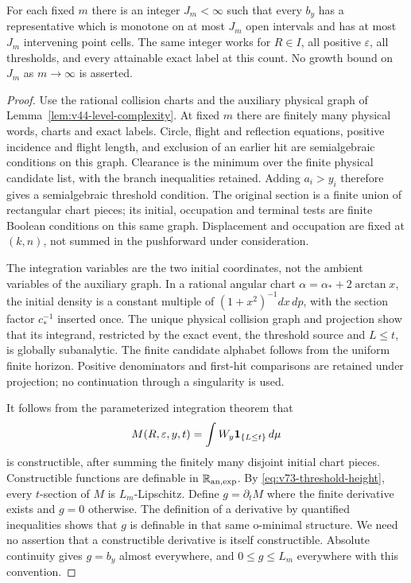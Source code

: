 \begin{lemma}
\label{lem:v73-threshold-monotonicity}
For each fixed $m$ there is an integer $J_m<\infty$ such that every
$b_y$ has a representative which is monotone on at most $J_m$
open intervals and has at most $J_m$ intervening point cells.
The same integer works for $R\in I$, all positive $\varepsilon$,
all thresholds, and every attainable exact label at this count.
No growth bound on $J_m$ as $m\to\infty$ is asserted.
\end{lemma}
\begin{proof}
Use the rational collision charts and the auxiliary physical graph
of Lemma~\ref{lem:v44-level-complexity}. At fixed $m$ there are
finitely many physical words, charts and exact labels. Circle,
flight and reflection equations, positive incidence and flight
length, and exclusion of an earlier hit are semialgebraic conditions
on this graph. Clearance is the minimum over the finite physical
candidate list, with the branch inequalities retained. Adding
$a_i>y_i$ therefore gives a semialgebraic threshold condition.
The original section is a finite union of rectangular chart pieces;
its initial, occupation and terminal tests are finite Boolean
conditions on this same graph. Displacement and occupation are fixed
at $(k,n)$, not summed in the pushforward under consideration.

The integration variables are the two initial coordinates, not the
ambient variables of the auxiliary graph. In a rational angular
chart $\alpha=\alpha_*+2\arctan x$, the initial density is a
constant multiple of $(1+x^2)^{-1}dx\,dp$, with the section factor
$c_*^{-1}$ inserted once. The unique physical collision graph and
projection show that its integrand, restricted by the exact event,
the threshold source and $L\le t$, is globally subanalytic. The
finite candidate alphabet follows from the uniform finite horizon.
Positive denominators and first-hit comparisons are retained under
projection; no continuation through a singularity is used.

It follows from the parameterized integration theorem
\cite[Theorem 1.3]{CMInt} that
\[
 M(R,\varepsilon,y,t)=\int W_y\mathbf1_{\{L\le t\}}\,d\mu
\]
is constructible, after summing the finitely many disjoint initial
chart pieces. Constructible functions are definable in
$\mathbb R_{\mathrm{an},\exp}$. By \eqref{eq:v73-threshold-height}, every
$t$-section of $M$ is $L_m$-Lipschitz. Define $g=\partial_tM$ where
the finite derivative exists and $g=0$ otherwise. The definition of
a derivative by quantified inequalities shows that $g$ is definable
in that same o-minimal structure. We need no assertion that a
constructible derivative is itself constructible. Absolute
continuity gives $g=b_y$ almost everywhere, and $0\le g\le L_m$
everywhere with this convention.


\end{proof}
